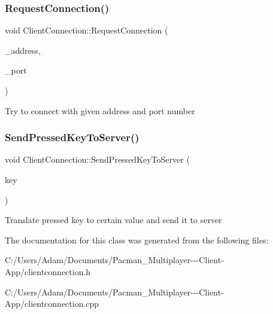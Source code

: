 \subsubsection{\texorpdfstring{Request\+Connection()}{RequestConnection()}}
{\footnotesize\ttfamily void Client\+Connection\+::\+Request\+Connection (\begin{DoxyParamCaption}\item[{Q\+Host\+Address}]{\+\_\+address,  }\item[{uint}]{\+\_\+port }\end{DoxyParamCaption})}

Try to connect with given address and port number \mbox{\label{class_client_connection_a2b0ac3043269fc55e415df2c05b880c1}} 
\subsubsection{\texorpdfstring{Send\+Pressed\+Key\+To\+Server()}{SendPressedKeyToServer()}}
{\footnotesize\ttfamily void Client\+Connection\+::\+Send\+Pressed\+Key\+To\+Server (\begin{DoxyParamCaption}\item[{char}]{key }\end{DoxyParamCaption})}

Translate pressed key to certain value and send it to server 

The documentation for this class was generated from the following files\+:\begin{DoxyCompactItemize}
\item 
C\+:/\+Users/\+Adam/\+Documents/\+Pacman\+\_\+\+Multiplayer-\/-\/-\/\+Client-\/\+App/clientconnection.\+h\item 
C\+:/\+Users/\+Adam/\+Documents/\+Pacman\+\_\+\+Multiplayer-\/-\/-\/\+Client-\/\+App/clientconnection.\+cpp\end{DoxyCompactItemize}
